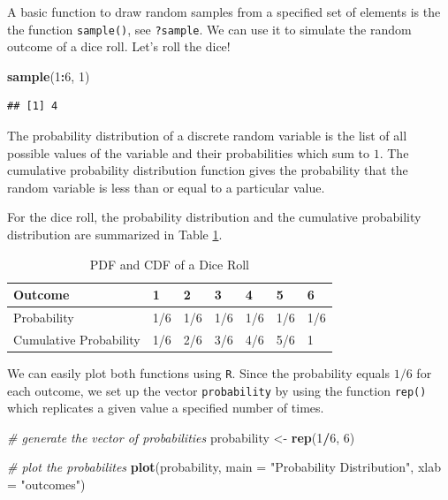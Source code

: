 \documentclass[]{book}
\newenvironment{Shaded}{\begin{snugshade}}{\end{snugshade}}
\newcommand{\KeywordTok}[1]{\textcolor[rgb]{0.13,0.29,0.53}{\textbf{#1}}}
\newcommand{\DataTypeTok}[1]{\textcolor[rgb]{0.13,0.29,0.53}{#1}}
\newcommand{\DecValTok}[1]{\textcolor[rgb]{0.00,0.00,0.81}{#1}}
\newcommand{\StringTok}[1]{\textcolor[rgb]{0.31,0.60,0.02}{#1}}
\newcommand{\CommentTok}[1]{\textcolor[rgb]{0.56,0.35,0.01}{\textit{#1}}}
\newcommand{\OperatorTok}[1]{\textcolor[rgb]{0.81,0.36,0.00}{\textbf{#1}}}
\newcommand{\NormalTok}[1]{#1}
\theoremstyle{definition}
\theoremstyle{definition}
\theoremstyle{definition}
\theoremstyle{remark}
\begin{document}
A basic function to draw random samples from a specified set of elements
is the the function \texttt{sample()}, see \texttt{?sample}. We can use
it to simulate the random outcome of a dice roll. Let's roll the dice!

\begin{Shaded}
\begin{Highlighting}[]
\KeywordTok{sample}\NormalTok{(}\DecValTok{1}\OperatorTok{:}\DecValTok{6}\NormalTok{, }\DecValTok{1}\NormalTok{) }
\end{Highlighting}
\end{Shaded}

\begin{verbatim}
## [1] 4
\end{verbatim}

The probability distribution of a discrete random variable is the list
of all possible values of the variable and their probabilities which sum
to \(1\). The cumulative probability distribution function gives the
probability that the random variable is less than or equal to a
particular value.

For the dice roll, the probability distribution and the cumulative
probability distribution are summarized in Table \ref{tab:pdist}.

\begin{table}

\caption{\label{tab:pdist}PDF and CDF of a Dice Roll}
\centering
\begin{tabular}[t]{l|l|l|l|l|l|l}
\hline
Outcome & 1 & 2 & 3 & 4 & 5 & 6\\
\hline
Probability & 1/6 & 1/6 & 1/6 & 1/6 & 1/6 & 1/6\\
\hline
Cumulative Probability & 1/6 & 2/6 & 3/6 & 4/6 & 5/6 & 1\\
\hline
\end{tabular}
\end{table}

We can easily plot both functions using \texttt{R}. Since the
probability equals \(1/6\) for each outcome, we set up the vector
\texttt{probability} by using the function \texttt{rep()} which
replicates a given value a specified number of times.

\begin{Shaded}
\begin{Highlighting}[]
\CommentTok{# generate the vector of probabilities }
\NormalTok{probability <-}\StringTok{ }\KeywordTok{rep}\NormalTok{(}\DecValTok{1}\OperatorTok{/}\DecValTok{6}\NormalTok{, }\DecValTok{6}\NormalTok{) }

\CommentTok{# plot the probabilites }
\KeywordTok{plot}\NormalTok{(probability, }
     \DataTypeTok{main =} \StringTok{"Probability Distribution"}\NormalTok{,}
     \DataTypeTok{xlab =} \StringTok{"outcomes"}\NormalTok{) }
\end{Highlighting}
\end{Shaded}
\end{document}
